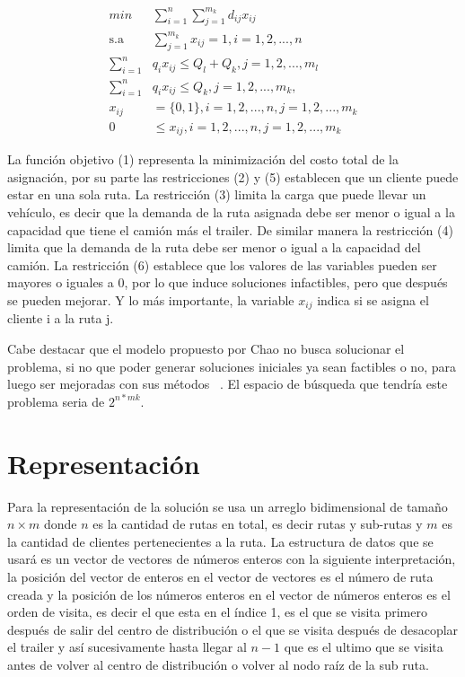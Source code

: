 \documentclass[letter, 10pt]{article}
\begin{document}
\begin{align}
min &\sum_{i=1}^{n} \sum_{j=1}^{m_k} d_{ij}x_{ij}\\
\text{s.a } &\sum_{j=1}^{m_k} x_{ij} = 1, i = 1,2,...,n\\
\sum_{i=1}^{n} &q_ix_{ij} \leq Q_l + Q_k,  j = 1,2,...,m_l\\
\sum_{i=1}^{n} &q_ix_{ij} \leq Q_k,  j = 1,2,...,m_k,\\
x_{ij} &= \{0,1\}, i=1,2,...,n ,  j = 1,2,...,m_k\\
0 &\leq x_{ij}, i=1,2,...,n ,  j = 1,2,...,m_k
\end{align}

La función objetivo (1) representa la minimización del costo total de la asignación, por su parte las restricciones (2) y (5) establecen que un cliente puede estar en una sola ruta. La restricción (3) limita la carga que puede llevar un vehículo, es decir que la demanda de la ruta asignada debe ser menor o igual a la capacidad que tiene el camión más el trailer. De similar manera la restricción (4) limita que la demanda de la ruta debe ser menor o igual a la capacidad del camión. La restricción (6) establece que los valores de las variables pueden ser mayores o iguales a 0, por lo que induce soluciones infactibles, pero que después se pueden mejorar. Y lo más importante, la variable $x_{ij}$ indica si se asigna el cliente i a la ruta j.

Cabe destacar que el modelo propuesto por Chao no busca solucionar el problema, si no que poder generar soluciones iniciales ya sean factibles o no, para luego ser mejoradas con sus métodos ~\cite{Chao}. 
El espacio de búsqueda que tendría este problema seria de $2^{n * mk}$.


\section{Representaci\'on}
Para la representación de la solución se usa un arreglo bidimensional de tamaño $n \times m$ donde $n$ es la cantidad de rutas en total, es decir rutas y sub-rutas y $m$ es la cantidad de clientes pertenecientes a la ruta. La estructura de datos que se usará es un vector de vectores de números enteros con la siguiente interpretación, la posición del vector de enteros en el vector de vectores es el número de ruta creada y la posición de los números enteros en el vector de números enteros es el orden de visita, es decir el que esta en el índice 1, es el que se visita primero después de salir del centro de distribución o el que se visita después de desacoplar el trailer y así sucesivamente hasta llegar al $n-1$ que es el ultimo que se visita antes de volver al centro de distribución o volver al nodo raíz de la sub ruta. 
\end{document}

